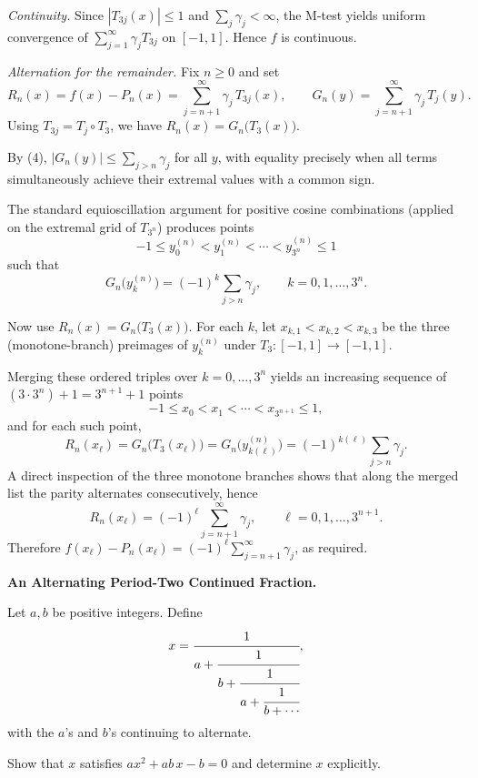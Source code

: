 \begin{solution}
\emph{Continuity.}
Since $|T_{3j}(x)|\le 1$ and $\sum_j\gamma_j<\infty$, the M-test yields uniform convergence
of $\sum_{j=1}^{\infty}\gamma_j T_{3j}$ on $[-1,1]$. Hence $f$ is continuous.

\smallskip
\emph{Alternation for the remainder.}
Fix $n\ge 0$ and set
\[
R_n(x)=f(x)-P_n(x)=\sum_{j=n+1}^{\infty}\gamma_j\,T_{3j}(x),\qquad
G_n(y)=\sum_{j=n+1}^{\infty}\gamma_j\,T_j(y).
\]
Using $T_{3j}=T_j\circ T_3$, we have $R_n(x)=G_n\!\big(T_3(x)\big)$.

By (4), $|G_n(y)|\le \sum_{j>n}\gamma_j$ for all $y$, with equality precisely when all
terms simultaneously achieve their extremal values with a common sign.

 The standard
equioscillation argument for positive cosine combinations (applied on the extremal grid of
$T_{3^n}$) produces points
\[
-1\le y^{(n)}_0<y^{(n)}_1<\cdots<y^{(n)}_{3^n}\le 1
\]
such that
\[
G_n\!\big(y^{(n)}_k\big)=(-1)^k\sum_{j>n}\gamma_j,\qquad k=0,1,\dots,3^n.
\]

Now use $R_n(x)=G_n\!\big(T_3(x)\big)$.
 For each $k$, let
$x_{k,1}<x_{k,2}<x_{k,3}$ be the three (monotone-branch) preimages of $y^{(n)}_k$ under
$T_3:[-1,1]\to[-1,1]$.

 Merging these ordered triples over $k=0,\dots,3^n$ yields an
increasing sequence of $(3\cdot 3^n)+1=3^{n+1}+1$ points
\[
-1\le x_0<x_1<\cdots<x_{3^{n+1}}\le 1,
\]
and for each such point,
\[
R_n(x_\ell)=G_n\big(T_3(x_\ell)\big)=G_n\!\big(y^{(n)}_{k(\ell)}\big)
= (-1)^{k(\ell)}\sum_{j>n}\gamma_j.
\]
A direct inspection of the three monotone branches shows that along the merged list the
parity alternates consecutively, hence
\[
R_n(x_\ell)=(-1)^\ell\sum_{j=n+1}^{\infty}\gamma_j,\qquad \ell=0,1,\dots,3^{n+1}.
\]
Therefore $f(x_\ell)-P_n(x_\ell)=(-1)^\ell\sum_{j=n+1}^{\infty}\gamma_j$, as required.
\end{solution}

\begin{problem}[CP-II-0410]
\label{prob:cp-ii-0410}
\textbf{An Alternating Period-Two Continued Fraction.}

	Let $a,b$ be positive integers. Define
	\[
	x=\cfrac{1}{\displaystyle a+\cfrac{1}{\displaystyle b+\cfrac{1}{\displaystyle a+\cfrac{1}{\displaystyle b+\cdots}}}},
	\]
	with the $a$'s and $b$'s continuing to alternate.

		 Show that $x$ satisfies $a x^{2}+ab\,x-b=0$ and determine $x$ explicitly.
\end{problem}

